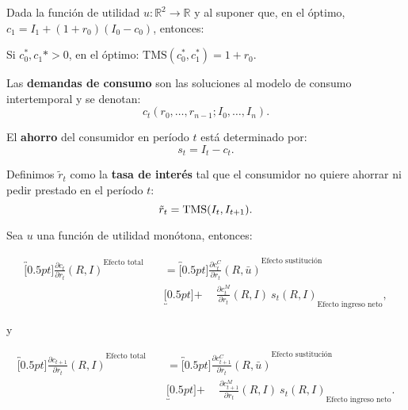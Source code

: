 \documentclass[8pt,a4paper]{extarticle}
\begin{document}
\begin{multicols}{3}
	Dada la función de utilidad $u : \mathbb{R}^2 \to \mathbb{R}$ y al suponer que, en el óptimo, $c_1 = I_1 + (1 + r_0) (I_0 - c_0)$, entonces:

	\begin{bulletlist}
		\item Si $c_0^*, c_1* > 0$, en el óptimo: $\text{TMS} (c_0^*, c_1^*) = 1 + r_0$.
	\end{bulletlist}

	\begin{boxdef}
		Las \textbf{demandas de consumo} son las soluciones al modelo de consumo intertemporal y se denotan:
		\[
			c_t(r_0, \ldots, r_{n-1}; I_0, \ldots, I_n)
			.\]
	\end{boxdef}

	\begin{boxdef}[Ahorro]
		El \textbf{ahorro} del consumidor en período $t$ está determinado por:
		\[
			s_t = I_t - c_t
			.\]
	\end{boxdef}

	\begin{boxdef}
		Definimos $\tilde{r}_t$ como la \textbf{tasa de interés} tal que el consumidor no quiere ahorrar ni pedir prestado en el período $t$:
		\[
			\tilde{r}_t = \text{\normalfont TMS} (I_t, I_{t+1})
			.\]
	\end{boxdef}

	\sectionbreak

	\begin{boxtheo}
		Sea $u$ una función de utilidad monótona, entonces:

		\begin{equation*}
			\begin{aligned}
				\overbracket[0.5pt]{\frac{\partial c_t}{\partial r_t} (R, I)}^{\text{Efecto total}} \quad & = \overbracket[0.5pt]{\frac{\partial c_t^C}{\partial r_t} (R, \bar{u})}^{\text{Efecto sustitución}}                  \\
				                                                                                          & \underbracket[0.5pt]{ + \quad\ \frac{\partial c_t^M}{\partial r_t} (R, I)\ s_t (R, I)}_{\text{Efecto ingreso neto}},
			\end{aligned}
		\end{equation*}

		y

		\begin{equation*}
			\begin{aligned}
				\overbracket[0.5pt]{\frac{\partial c_{t+1}}{\partial r_t} (R, I)}^{\text{Efecto total}} \quad & = \overbracket[0.5pt]{\frac{\partial c_{t+1}^C}{\partial r_t} (R, \bar{u})}^{\text{Efecto sustitución}}                  \\
				                                                                                              & \underbracket[0.5pt]{ + \quad\ \frac{\partial c_{t+1}^M}{\partial r_t} (R, I)\ s_t (R, I)}_{\text{Efecto ingreso neto}}.
			\end{aligned}
		\end{equation*}


\end{boxtheo}
\end{multicols}
\end{document}
